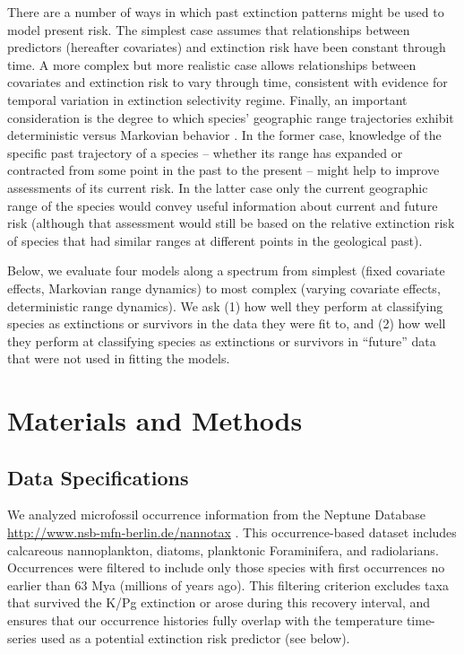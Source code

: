 \documentclass[12pt,letterpaper]{article}
\begin{document}
\begin{refsection}
There are a number of ways in which past extinction patterns might be used to model present risk. The simplest case assumes that relationships between predictors (hereafter covariates) and extinction risk have been constant through time. A more complex but more realistic case allows relationships between covariates and extinction risk to vary through time, consistent with evidence for temporal variation in extinction selectivity regime. Finally, an important consideration is the degree to which species’ geographic range trajectories exhibit deterministic versus Markovian behavior \citep{Liow2007,Kiessling2013,Foote2007b,Pigot2012}. In the former case, knowledge of the specific past trajectory of a species – whether its range has expanded or contracted from some point in the past to the present – might help to improve assessments of its current risk. In the latter case only the current geographic range of the species would convey useful information about current and future risk (although that assessment would still be based on the relative extinction risk of species that had similar ranges at different points in the geological past).

Below, we evaluate four models along a spectrum from simplest (fixed covariate effects, Markovian range dynamics) to most complex (varying covariate effects, deterministic range dynamics). We ask (1) how well they perform at classifying species as extinctions or survivors in the data they were fit to, and (2) how well they perform at classifying species as extinctions or survivors in “future” data that were not used in fitting the models.



\section{Materials and Methods}

\subsection{Data Specifications}

We analyzed microfossil occurrence information from the Neptune Database \url{http://www.nsb-mfn-berlin.de/nannotax} \citep{Lazarus1994,SpencerCervato1999}. This occurrence-based dataset includes calcareous nannoplankton, diatoms, planktonic Foraminifera, and radiolarians. Occurrences were filtered to include only those species with first occurrences no earlier than 63 Mya (millions of years ago). This filtering criterion excludes taxa that survived the K/Pg extinction or arose during this recovery interval, and ensures that our occurrence histories fully overlap with the temperature time-series used as a potential extinction risk predictor (see below). 


\end{refsection}
\end{document}
